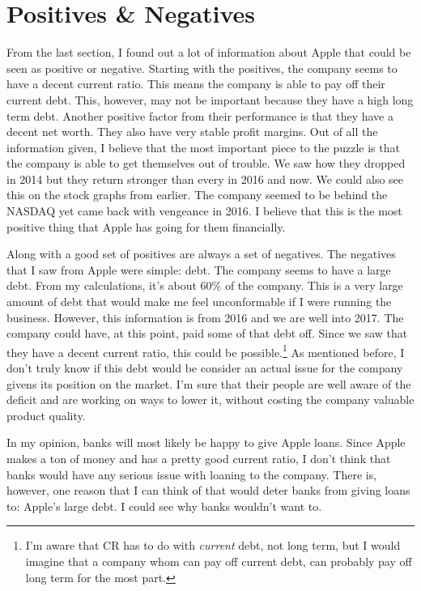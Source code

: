 \documentclass[12pt,a4paper,titlepage]{article}
\begin{document}
\newpage

\section{Positives \& Negatives}
From the last section, I found out a lot of information about Apple that could
be seen as positive or negative. Starting with the positives, the company seems
to have a decent current ratio. This means the company is able to pay off their
current debt. This, however, may not be important because they have a high long
term debt. Another positive factor from their performance is that they have a
decent net worth. They also have very stable profit margins. Out of all the
information given, I believe that the most important piece to the puzzle is that
the company is able to get themselves out of trouble. We saw how they dropped
in 2014 but they return stronger than every in 2016 and now. We could also see
this on the stock graphs from earlier. The company seemed to be behind the
NASDAQ yet came back with vengeance in 2016. I believe that this is the most
positive thing that Apple has going for them financially.

Along with a good set of positives are always a set of negatives. The negatives
that I saw from Apple were simple: debt. The company seems to have a large
debt. From my calculations, it's about 60\% of the company. This is a very large
amount of debt that would make me feel unconformable if I were running the
business. However, this information is from 2016 and we are well into 2017. The
company could have, at this point, paid some of that debt off. Since we saw that
they have a decent current ratio, this could be possible.\footnote{I'm aware
  that CR has to do with \emph{current} debt, not long term, but I would imagine
  that a company whom can pay off current debt, can probably pay off long term
  for the most part.} As mentioned before, I don't truly know if this debt would
be consider an actual issue for the company givens its position on the
market. I'm sure that their people are well aware of the deficit and are working
on ways to lower it, without costing the company valuable product quality.

In my opinion, banks will most likely be happy to give Apple loans. Since Apple
makes a ton of money and has a pretty good current ratio, I don't think that
banks would have any serious issue with loaning to the company. There is,
however, one reason that I can think of that would deter banks from giving loans
to: Apple's large debt. I could see why banks wouldn't want to.
\end{document}
